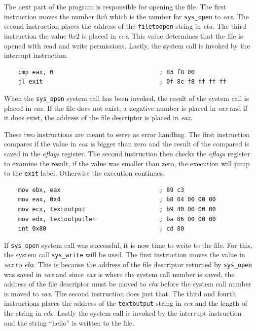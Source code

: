 \documentclass[11pt,twoside]{eitExjobb}
\begin{document}
\noindent The next part of the program is responsible for opening the file. The first instruction moves the number $0x5$ which is the number for \texttt{sys\_open} to \emph{eax}. The second instruction places the address of the \texttt{filetoopen} string in \emph{ebx}. The third instruction the value $0x2$ is placed in \emph{ecx}. This value determines that the file is opened with read and write permissions. Lastly, the system call is invoked by the interrupt instruction.

\begin{verbatim}
    cmp eax, 0                              ; 83 f8 00
    jl exit                                 ; 0f 8c f8 ff ff ff
\end{verbatim}

\noindent When the \texttt{sys\_open} system call has been invoked, the result of the system call is placed in \emph{eax}. If the file does not exist, a negative number is placed in \emph{eax} and if it does exist, the address of the file descriptor is placed in \emph{eax}. 
 
These two instructions are meant to serve as error handling. The first instruction compares if the value in \emph{eax} is bigger than zero and the result of the compared is saved in the \emph{eflags} register. The second instruction then checks the \emph{eflags} register to examine the result, if the value was smaller than zero, the execution will jump to the \texttt{exit} label. Otherwise the execution continues.

\begin{verbatim}
    mov ebx, eax                            ; 89 c3
    mov eax, 0x4                            ; b8 04 00 00 00
    mov ecx, textoutput                     ; b9 40 00 00 00 
    mov edx, textoutputlen                  ; ba 06 00 00 00
    int 0x80                                ; cd 80
\end{verbatim}

\noindent If \texttt{sys\_open} system call was successful, it is now time to write to the file. For this, the system call \texttt{sys\_write} will be used. The first instruction moves the value in \emph{eax} to \emph{ebx}. This is because the address of the file descriptor returned by \texttt{sys\_open} was saved in \emph{eax} and since \emph{eax} is where the system call number is saved, the address of the file descriptor must be moved to \emph{ebx} before the system call number is moved to \emph{eax}. The second instruction does just that. The third and fourth instructions places the address of the \texttt{textoutput} string in \emph{ecx} and the length of the string in \emph{edx}. Lastly the system call is invoked by the interrupt instruction and the string ``hello'' is written to the file.
\end{document}
